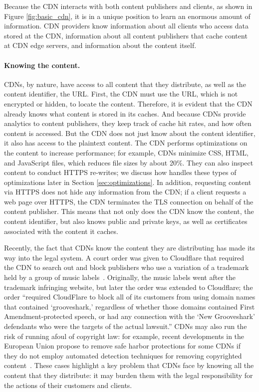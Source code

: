 Because the CDN interacts with both content publishers and clients, as shown in Figure \ref{fig:basic_cdn}, it is in a unique position 
to learn an enormous amount of information.  CDN providers know information about all clients who
access data stored at the CDN, information about all content publishers that cache content at 
CDN edge servers, and information about the content itself.

\paragraph{Knowing the content.}  CDNs, by nature, have access to all content that they distribute, as well as the 
content identifier, the URL.  First, the CDN must use the URL, which is not 
encrypted or hidden, to locate the content. Therefore, it is evident that the CDN already knows what content is 
stored in its caches.  And because CDNs provide analytics to content publishers, they keep track of cache hit 
rates, and how often content is accessed.  But the CDN does not just know about the content identifier, it also 
has access to the plaintext content.  The CDN performs optimizations on the content to increase performance; 
for example, CDNs minimize CSS, HTML, and JavaScript files, which reduces file sizes by about 20\%.  They can 
also inspect content to conduct HTTPS re-writes; we discuss how \system{} handles these types of optimizations later 
in Section \ref{sec:optimizations}. In addition, requesting content via HTTPS does not hide any information 
from the CDN; if a client requests a web page over HTTPS, the CDN terminates the TLS connection on behalf of the 
content publisher.  This means that not only does the CDN know the content, the content identifier, but also knows 
public and private keys, as well as certificates associated with the content it caches.  

Recently, the fact that CDNs 
know the content they are distributing has made its way into the legal system.  A court order was given to Cloudflare 
that required the CDN to search out and block publishers who use a variation of a trademark held by a group of 
music labels~\cite{eff_cloudflare_trademark}.  Originally, the music labels went after the trademark infringing 
website, but later the order was extended to Cloudflare; the order ``required CloudFlare to block all of its customers 
from using domain names that contained `grooveshark,' regardless of whether those domains contained First 
Amendment-protected speech, or had any connection with the `New Grooveshark' defendants who were the 
targets of the actual lawsuit.'' CDNs may also run the risk of running afoul of
copyright law: for example, recent developments in the European Union propose to
remove safe harbor protections for some CDNs if they do not employ automated detection
techniques for removing copyrighted content~\cite{eu-copyright}.
These cases highlight a key problem that CDNs face by knowing all
the content
that they distribute: it may burden them with the legal responsibility for the actions of their customers 
and clients.

